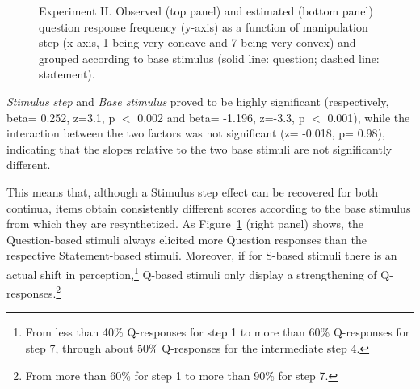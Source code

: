 \begin{figure}
\centering
{}
\caption{Experiment II. Observed (top panel) and estimated (bottom panel) question response frequency (y-axis) as a function of manipulation step (x-axis, 1 being very concave and 7 being very convex) and grouped according to base stimulus (solid line: question; dashed line: statement).}
\label{fig307}\end{figure}

\textit{Stimulus step} and \textit{Base stimulus} proved to be highly significant (respectively, beta= 0.252,  z=3.1, p $<$ 0.002 and beta= -1.196, z=-3.3, p $<$ 0.001), while the interaction between the two factors was not significant (z= -0.018, p= 0.98), indicating that the slopes relative to the two base stimuli are not significantly different. 

This means that, although a Stimulus step effect can be recovered for both continua, items obtain consistently different scores according to the base stimulus from which they are resynthetized. As Figure~\ref{fig307} (right panel) shows, the Question-based stimuli always elicited more Question responses than the respective Statement-based stimuli. Moreover, if for S-based stimuli there is an actual shift in perception,\footnote{From less than 40\% Q-responses for step 1 to more than 60\% Q-responses for step 7, through about 50\% Q-responses for the intermediate step 4.} Q-based stimuli only display a strengthening of Q-responses.\footnote{From more than 60\% for step 1 to more than 90\% for step 7.}

